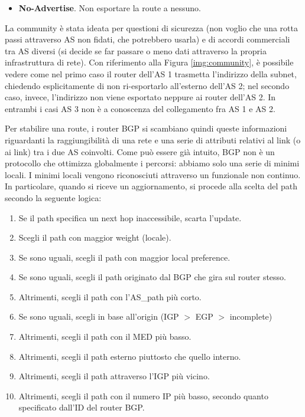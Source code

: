 \begin{itemize}
\begin{itemize}
		\item \textbf{No-Advertise}. Non esportare la route a nessuno.
	\end{itemize}
	La community è stata ideata per questioni di sicurezza (non voglio che una rotta passi attraverso AS non fidati, che potrebbero usarla) e di accordi commerciali tra AS diversi (si decide se far passare o meno dati attraverso la propria infrastruttura di rete). Con riferimento alla Figura \ref{img:community}, è possibile vedere come nel primo caso il router dell'AS 1 trasmetta l'indirizzo della subnet, chiedendo esplicitamente di non ri-esportarlo all'esterno dell'AS 2; nel secondo caso, invece, l'indirizzo non viene esportato neppure ai router dell'AS 2. In entrambi i casi AS 3 non è a conoscenza del collegamento fra AS 1 e AS 2.
\end{itemize}
Per stabilire una route, i router BGP si scambiano quindi queste informazioni riguardanti la raggiungibilità di una rete e una serie di attributi relativi al link (o ai link) tra i due AS coinvolti. Come può essere già intuito, BGP non è un protocollo che ottimizza globalmente i percorsi: abbiamo solo una serie di minimi locali. I minimi locali vengono riconosciuti attraverso un funzionale non continuo. In particolare, quando si riceve un aggiornamento, si procede alla scelta del path secondo la seguente logica:
\begin{enumerate}
	\item Se il path specifica un next hop inaccessibile, scarta l'update.
	\item Scegli il path con maggior weight (locale).
	\item Se sono uguali, scegli il path con maggior local preference.
	\item Se sono uguali, scegli il path originato dal BGP che gira sul router stesso.
	\item Altrimenti, scegli il path con l'AS\_path più corto.
	\item Se sono uguali, scegli in base all'origin (IGP $>$ EGP $>$ incomplete)
	\item Altrimenti, scegli il path con il MED più basso.
	\item Altrimenti, scegli il path esterno piuttosto che quello interno.
	\item Altrimenti, scegli il path attraverso l'IGP più vicino.
	\item Altrimenti, scegli il path con il numero IP più basso, secondo quanto specificato dall'ID del router BGP.
\end{enumerate}
